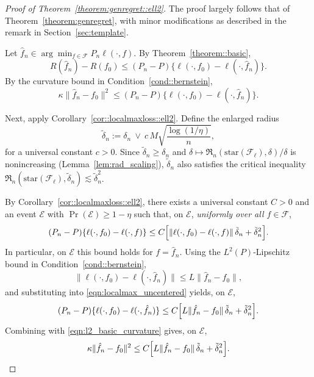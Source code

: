 \documentclass[11pt]{article}
\theoremstyle{plain}
\theoremstyle{definition} %
\begin{document}
\begin{proof}[Proof of Theorem~\ref{theorem:genregret::ell2}]
The proof largely follows that of Theorem~\ref{theorem:genregret}, with minor modifications as described in the remark in Section~\ref{sec:template}.

Let $\hat f_n\in\arg\min_{f\in\mathcal F} P_n\ell(\cdot,f)$. By Theorem~\ref{theorem::basic},
\[
R(\hat f_n)-R(f_0)
\le
(P_n-P)\bigl\{\ell(\cdot,f_0)-\ell(\cdot,\hat f_n)\bigr\}.
\]
By the curvature bound in Condition~\ref{cond::bernstein},
\begin{equation}
\label{eqn:l2_basic_curvature}
\kappa\|\hat f_n-f_0\|^2
\le
(P_n-P)\bigl\{\ell(\cdot,f_0)-\ell(\cdot,\hat f_n)\bigr\}.
\end{equation}

Next, apply Corollary~\ref{cor::localmaxloss::ell2}. 
Define the enlarged radius
\[
\tilde\delta_n
:=
\delta_n\ \vee\ c\,M\sqrt{\frac{\log(1/\eta)}{n}},
\]
for a universal constant $c>0$. Since $\tilde\delta_n\ge \delta_n$ and
$\delta\mapsto\mathfrak{R}_n(\mathrm{star}(\mathcal F_\ell),\delta)/\delta$ is nonincreasing
(Lemma~\ref{lem:rad_scaling}), $\tilde\delta_n$ also satisfies the critical inequality
$\mathfrak{R}_n(\mathrm{star}(\mathcal F_\ell),\tilde\delta_n)\lesssim \tilde\delta_n^2$.

By Corollary~\ref{cor::localmaxloss::ell2}, there exists a universal constant $C>0$ and an event
$\mathcal E$ with $\Pr(\mathcal E)\ge 1-\eta$ such that, on $\mathcal E$,
\emph{uniformly over all $f\in\mathcal F$},
\begin{equation}
\label{eqn:localmax_uncentered}
(P_n-P)\{\ell(\cdot,f_0)-\ell(\cdot,f)\}
\le
C\Bigl[
\|\ell(\cdot,f_0)-\ell(\cdot,f)\|\,\tilde\delta_n
+
\tilde\delta_n^2
\Bigr].
\end{equation}
In particular, on $\mathcal E$ this bound holds for $f=\hat f_n$. Using the $L^2(P)$-Lipschitz bound
in Condition~\ref{cond::bernstein},
\[
\|\ell(\cdot,f_0)-\ell(\cdot,\hat f_n)\|
\le
L\|\hat f_n-f_0\|,
\]
and substituting into \eqref{eqn:localmax_uncentered} yields, on $\mathcal E$,
\[
(P_n-P)\{\ell(\cdot,f_0)-\ell(\cdot,\hat f_n)\}
\le
C\Bigl[
L\|\hat f_n-f_0\|\,\tilde\delta_n
+
\tilde\delta_n^2
\Bigr].
\]
Combining with \eqref{eqn:l2_basic_curvature} gives, on $\mathcal E$,
\begin{equation}
\label{eqn:l2_fixed_point}
\kappa\|\hat f_n-f_0\|^2
\le
C\Bigl[
L\|\hat f_n-f_0\|\,\tilde\delta_n
+
\tilde\delta_n^2
\Bigr].
\end{equation}


\end{proof}
\end{document}
